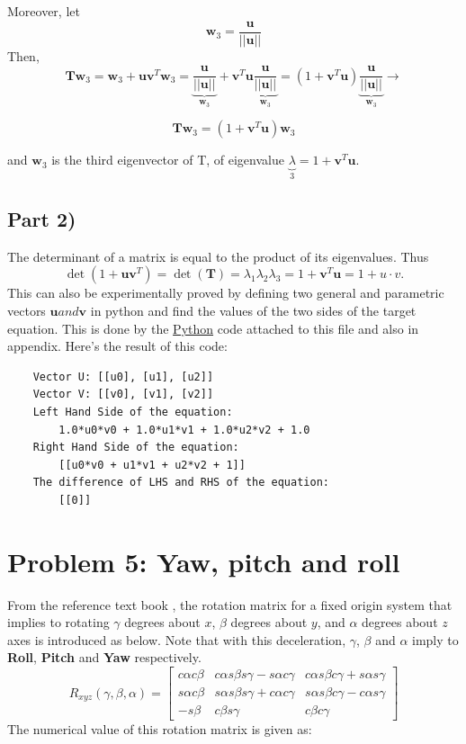 \documentclass[conference]{IEEEtran}
\begin{document}
Moreover, let 
\[ 
\mathbf{w}_3 = 	\frac{\mathbf{u}}{||\mathbf{u}||} 
\]
Then,
\[
\mathbf{T}\mathbf{w}_3=	\mathbf{w}_3+\mathbf{u}\mathbf{v}^T\mathbf{w}_3=		\underbrace{\frac{\mathbf{u}}{||\mathbf{u}||}}_{\mathbf{w}_{3}}+\mathbf{v}^{T}\mathbf{u}\underbrace{\frac{\mathbf{u}}{||\mathbf{u}||}}_{\mathbf{w}_{3}}
=\left(1+\mathbf{v}^{T}\mathbf{u}\right)\underbrace{\frac{\mathbf{u}}{||\mathbf{u}||}}_{\mathbf{w}_{3}} \rightarrow
\]

\[
\mathbf{T}\mathbf{w}_3 = \left(1+\mathbf{v}^{T} \mathbf{u}\right)\mathbf{w}_{3}
\]


and \(\mathbf{w}_{3}\) is the third eigenvector of T, of eigenvalue \(\underbrace{\lambda}_{3}=1+\mathbf{v}^{T} \mathbf{u}.\)
\subsection*{Part 2)}
The determinant of a matrix is equal to the product of its eigenvalues. Thus
\[
\det(1 + \mathbf{u}\mathbf{v}^T) = \det(\mathbf{T}) = \lambda_1\lambda_2\lambda_3 = 1 + \mathbf{v}^T\mathbf{u} = 1 + u \cdot v.
\]
This can also be experimentally proved by defining two general and parametric vectors \( \mathbf{u} and \mathbf{v} \) in python and find the values of the two sides of the target equation. This is done by the \underline{Python} code attached to this file and also in appendix. Here's the result of this code:
\scriptsize
\begin{verbatim}
    Vector U: [[u0], [u1], [u2]]
    Vector V: [[v0], [v1], [v2]]
    Left Hand Side of the equation:  
        1.0*u0*v0 + 1.0*u1*v1 + 1.0*u2*v2 + 1.0
    Right Hand Side of the equation:         
        [[u0*v0 + u1*v1 + u2*v2 + 1]]
    The difference of LHS and RHS of the equation:   
        [[0]]
\end{verbatim}

\vspace{10px}
\section{Problem 5: Yaw, pitch and roll}
From the reference text book \cite{b12}, the rotation matrix for a fixed origin system that implies to rotating $\gamma$ degrees about $x$, $\beta$ degrees about $y$, and $\alpha$ degrees about $z$ axes is introduced as below. Note that with this deceleration, $\gamma$, $\beta$ and $\alpha$ imply to \textbf{Roll}, \textbf{Pitch} and \textbf{Yaw} respectively.
$$
R_{xyz}(\gamma, \beta, \alpha) = 
\begin{bmatrix}
    c\alpha c\beta & c\alpha s\beta s\gamma - s\alpha c\gamma & c\alpha s\beta c\gamma + s\alpha s\gamma \\
    s\alpha c\beta & s\alpha s\beta s \gamma + c \alpha  c \gamma & s \alpha s \beta c \gamma -	c \alpha s \gamma \\
    -s\beta & c \beta s \gamma & c \beta c\gamma
\end{bmatrix}
$$
The numerical value of this rotation matrix is given as:
\end{document}
